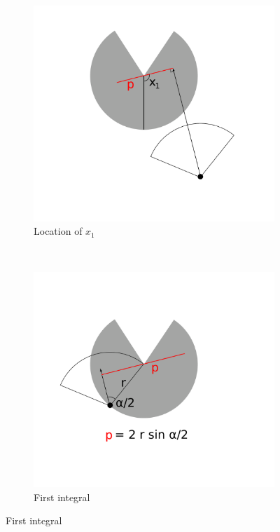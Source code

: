 \documentclass[a4paper,10pt,reqno,oneside]{amsart}
\begin{document}
\begin{figure}[t]
        \centering
	\begin{subfigure}[t]{0.45\textwidth}
                \centering
		\includegraphics[width=1\textwidth, trim= 6cm 1cm 6cm 0.3cm]{imgs/x1.pdf}
                \caption{Location of $x_1$ }
                \label{f:x2start}
        \end{subfigure}%
	~ 
	\begin{subfigure}[t]{0.45\textwidth}
                \centering
		\includegraphics[width=1\textwidth, trim= 6cm 1cm 6cm 0.3cm]{imgs/firstIntegral.pdf}
                \caption{First integral}
                \label{f:firstInt}
        \end{subfigure}%
	 

\end{figure}
\end{document}
